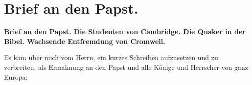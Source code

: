 
\chapter[Brief an den Papst.]{Brief an den Papst.}

\begin{center}
\textbf{Brief an den Papst. Die Studenten von Cambridge. Die Quaker
in der Bibel. Wachsende Entfremdung von Cromwell.}
\end{center}

Es kam über mich vom Herrn, ein kurzes Schreiben 
aufzusetzen und zu verbreiten, als Ermahnung an den 
Papst und alle
Könige und Herrscher von ganz Europa:


